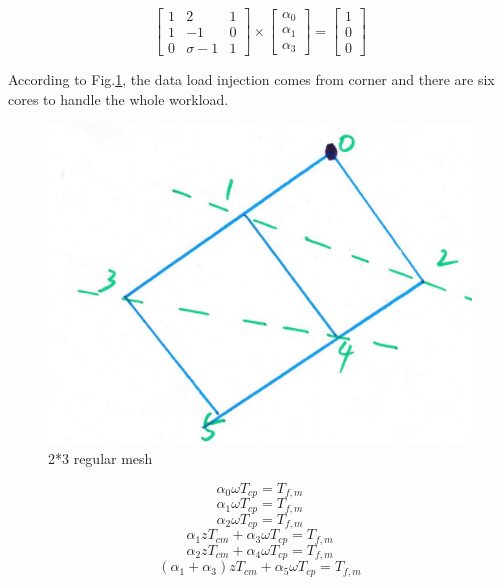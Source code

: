 \begin{equation}
{
\left[ \begin{array}{ccc}
1 & 2 & 1\\
1 & -1 & 0\\
0 & \sigma-1 & 1
\end{array} 
\right ]} \times \left[ \begin{array}{c}
\alpha_{0} \\
\alpha_{1} \\
\alpha_{3} 
\end{array} 
\right ] = \left[ \begin{array}{c}
1 \\
0 \\
0 
\end{array} 
\right ]
\end{equation}

\vspace*{50pt}
According to Fig.\ref{23f}, the data load injection comes from corner and there are
six cores to handle the whole workload.

\begin{figure}[h]
\centering\includegraphics[width=0.7\linewidth]{figure/c23_f}
\caption{2*3 regular mesh}
\label{23f}
\end{figure}

$$\alpha_{0} \omega T_{cp} = T_{f,m}$$ 
$$\alpha_{1} \omega T_{cp} = T_{f,m}$$
$$\alpha_{2} \omega T_{cp} = T_{f,m}$$
$$\alpha_{1}zT_{cm} + \alpha_{3}\omega T_{cp} = T_{f,m}$$
$$\alpha_{2}zT_{cm} + \alpha_{4}\omega T_{cp} = T_{f,m}$$
$$(\alpha_{1} + \alpha_{3})zT_{cm} + \alpha_{5}\omega T_{cp} = T_{f,m}$$

